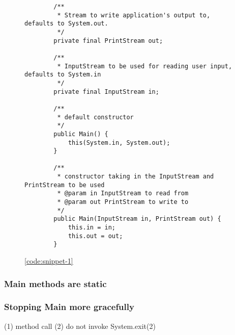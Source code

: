 \par
\begin{figure}
\begin{lstlisting}
	    /**
		 * Stream to write application's output to, defaults to System.out.
		 */
		private final PrintStream out;

		/**
		 * InputStream to be used for reading user input, defaults to System.in
		 */
		private final InputStream in;

		/**
		 * default constructor
		 */
		public Main() {
			this(System.in, System.out);
		}

		/**
		 * constructor taking in the InputStream and PrintStream to be used
		 * @param in InputStream to read from
		 * @param out PrintStream to write to
		 */
		public Main(InputStream in, PrintStream out) {
			this.in = in;
			this.out = out;
		}
\end{lstlisting} 
\ref{code:snippet-1}
\end{figure}

\subsubsection{Main methods are static}
\subsubsection{Stopping Main more gracefully}
(1) method call 
(2) do not invoke System.exit(2) 

